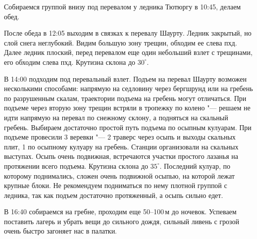     Собираемся группой внизу под перевалом у ледника Тютюргу в 10:45, делаем обед.

    После обеда в 12:05 выходим в связках к перевалу Шаурту. Ледник закрытый, но слой снега неглубокий. Видим большую
    зону трещин, обходим ее слева пхд. Далее ледник плоский, перед перевалом еще один небольший взлет с трещинами,
    его обходим слева пхд. Крутизна склона до $30^\circ$.

    В 14:00 подходим под перевальный взлет. Подъем на перевал Шаурту возможен несколькими способами: напрямую на
    седловину через бергшрунд или на гребень по разрушенным скалам, траектории подъема на гребень могут отличаться.
    При подъеме через вторую зону трещин встряли в тропежку по колено "--- решаем не идти напрямую на перевал по снежному
    склону, а подняться на скальный гребень. Выбираем достаточно простой путь подъема по осыпным кулуарам. При подъеме
    провесили 3 веревки "--- 2 траверс через осыпь и выходы скальных плит, 1 по осыпному кулуару на гребень. Станции
    организовали на скальных выступах. Осыпь очень подвижная, встречаются участки простого лазанья на протяжении
    всего подъема. Крутизна склона до $35^\circ$. Последний кулуар, по которому поднимались, сложен очень подвижной
    осыпью, на которой лежат крупные блоки. Не рекомендуем подниматься по нему плотной группой с ледника, так как
    подъем достаточно протяженный, а осыпь сильно едет.

    В 16:40 собираемся на гребне, проходим еще 50--100\,м до ночевок. Успеваем поставить лагерь и убрать вещи до
    сильного дождя, сильный ливень с грозой очень быстро загоняет нас в палатки.

    \FloatBarrier
    
    
    
    
    
    
    

